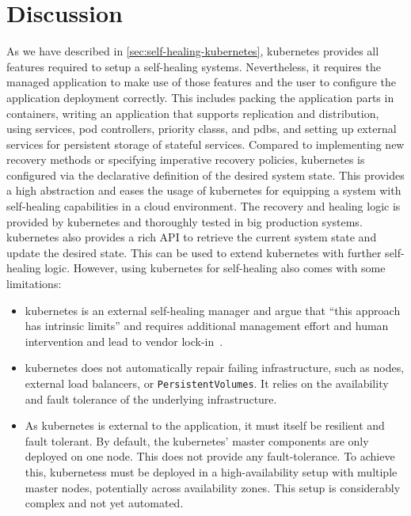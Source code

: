 
\section{Discussion}\label{sec:discussion}
  As we have described in \cref{sec:self-healing-kubernetes}, \gls{kubernetes} provides all features required to setup a self-healing systems.
  Nevertheless, it requires the managed application to make use of those features and the user to configure the application deployment correctly.
  This includes packing the application parts in containers, writing an application that supports replication and distribution, using \glspl{service}, \glspl{pod controller}, \glspl{priority class}, and \glspl{pdb}, and setting up external services for persistent storage of stateful services.
  Compared to implementing new recovery methods or specifying imperative recovery policies, \gls{kubernetes} is configured via the declarative definition of the desired system state.
  This provides a high abstraction and eases the usage of \gls{kubernetes} for equipping a system with self-healing capabilities in a cloud environment.
  The recovery and healing logic is provided by \gls{kubernetes} and thoroughly tested in big production systems.
  \Gls{kubernetes} also provides a rich API to retrieve the current system state and update the desired state.
  This can be used to extend \gls{kubernetes} with further self-healing logic.
  However, using \gls{kubernetes} for self-healing also comes with some limitations:
  \begin{itemize}
    \item \Gls{kubernetes} is an external self-healing manager and \citeauthor{ToffettiMicroservices} argue that \enquote{this approach has intrinsic limits} and requires additional management effort and human intervention and lead to vendor lock-in~\cite{ToffettiMicroservices}.
    \item \Gls{kubernetes} does not automatically repair failing infrastructure, such as nodes, external load balancers, or \texttt{PersistentVolumes}.
      It relies on the availability and fault tolerance of the underlying infrastructure.
    \item As \gls{kubernetes} is external to the application, it must itself be resilient and fault tolerant.
      By default, the \gls{kubernetes}' master components are only deployed on one node.
      This does not provide any fault-tolerance.
      To achieve this, \glspl{kubernetes} must be deployed in a high-availability setup with multiple master nodes, potentially across availability zones.
      This setup is considerably complex and not yet automated.
  \end{itemize}
